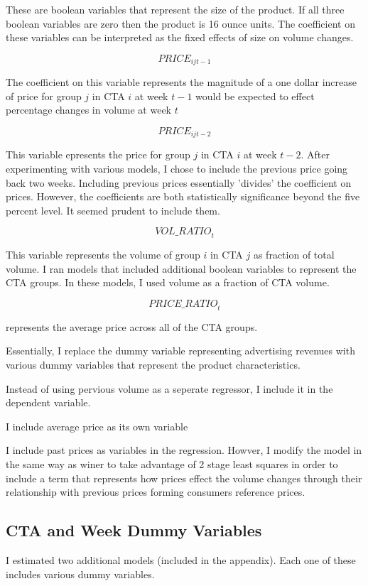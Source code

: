 \documentclass{article}
\begin{document}
These are boolean variables that represent the size of the product. If all three boolean variables are zero then the product is 16 ounce units.  The coefficient on these variables can be interpreted as the fixed effects of size on volume changes.

$${PRICE}_{ijt-1} $$

The coefficient on this variable represents the magnitude of a one dollar increase of price for group $j$ in CTA $i$ at week $t-1$ would be expected to effect percentage changes in volume at week $t$

$${PRICE}_{ijt-2} $$ 

This variable epresents the price for group $j$ in CTA $i$ at week $t-2$. After experimenting with various models, I chose to include the previous price going back two weeks. Including previous prices essentially 'divides' the coefficient on prices. However, the coefficients are both statistically significance beyond the five percent level. It seemed prudent to include them.

$${VOL\_RATIO}_t $$ 

This variable represents the volume of group $i$ in CTA $j$ as  fraction of total volume. I ran models that included additional boolean variables to represent the CTA groups. In these models, I used volume as a fraction of CTA volume.

$${PRICE\_RATIO}_{t} $$ 

represents the average price across all of the CTA groups.

Essentially, I replace the dummy variable representing advertising revenues with various dummy variables that represent the product characteristics.

Instead of using pervious volume as a seperate regressor, I include it in the dependent variable.

I include average price as its own variable

I include past prices as variables in the regression. Howver, I modify the model in the same way as winer to take advantage of 2 stage least squares in order to include a term that represents how prices effect the volume changes through their relationship with previous prices forming consumers reference prices.


\subsection{CTA and Week Dummy Variables}

I estimated two additional models (included in the appendix). Each one of these includes various dummy variables.
\end{document}

